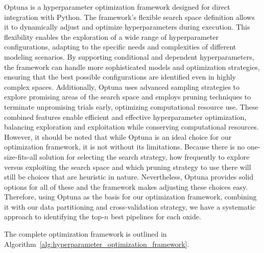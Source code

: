 Optuna is a hyperparameter optimization framework designed for direct integration with Python.
The framework's flexible search space definition allows it to dynamically adjust and optimize hyperparameters during execution. 
This flexibility enables the exploration of a wide range of hyperparameter configurations, adapting to the specific needs and complexities of different modeling scenarios. 
By supporting conditional and dependent hyperparameters, the framework can handle more sophisticated models and optimization strategies, ensuring that the best possible configurations are identified even in highly complex spaces.
Additionally, Optuna uses advanced sampling strategies to explore promising areas of the search space and employs pruning techniques to terminate unpromising trials early, optimizing computational resource use. These combined features enable efficient and effective hyperparameter optimization, balancing exploration and exploitation while conserving computational resources. \cite{optuna_2019}
However, it should be noted that while Optuna is an ideal choice for our optimization framework, it is not without its limitations.
Because there is no one-size-fits-all solution for selecting the search strategy, how frequently to explore versus exploiting the search space and which pruning strategy to use there will still be choices that are heuristic in nature.
Nevertheless, Optuna provides solid options for all of these and the framework makes adjusting these choices easy.
Therefore, using Optuna as the basis for our optimization framework, combining it with our data partitioning and cross-validation strategy, we have a systematic approach to identifying the top-$n$ best pipelines for each oxide.

The complete optimization framework is outlined in Algorithm~\ref{alg:hyperparameter_optimization_framework}.

